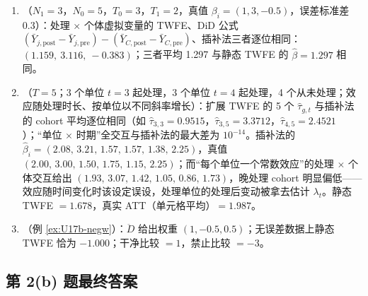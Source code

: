 \begin{exmp}[数值验证：$\hat\beta_i$ 的三种算法、扩展 TWFE = 插补、负权重]\label{ex:U17b-sim}
\begin{enumerate}
  \item {}（$N_1=3$，$N_0=5$，$T_0=3$，$T_1=2$，真值 $\beta_i=(1,3,-0.5)$，误差标准差 0.3）：处理 $\times$ 个体虚拟变量的 TWFE、DiD 公式 $(\bar Y_{j,\mathrm{post}}-\bar Y_{j,\mathrm{pre}})-(\bar Y_{C,\mathrm{post}}-\bar Y_{C,\mathrm{pre}})$、插补法三者逐位相同：$(1.159,\ 3.116,\ -0.383)$；三者平均 1.297 与静态 TWFE 的 $\hat\beta=1.297$ 相同。
  \item {}（$T=5$；3 个单位 $t=3$ 起处理，3 个单位 $t=4$ 起处理，4 个从未处理；效应随处理时长、按单位以不同斜率增长）：扩展 TWFE 的 5 个 $\hat\tau_{g,t}$ 与插补法的 cohort 平均逐位相同（如 $\hat\tau_{3,3}=0.9515$，$\hat\tau_{3,5}=3.3712$，$\hat\tau_{4,5}=2.4521$）；“单位 $\times$ 时期”全交互与插补法的最大差为 $10^{-14}$。插补法的 $\hat\beta_i=(2.08,\,3.21,\,1.57,\,1.57,\,1.38,\,2.25)$，真值 $(2.00,\,3.00,\,1.50,\,1.75,\,1.15,\,2.25)$；而“每个单位一个常数效应”的处理 $\times$ 个体交互给出 $(1.93,\,3.07,\,1.42,\,1.05,\,0.86,\,1.73)$，晚处理 cohort 明显偏低——效应随时间变化时该设定误设，处理单位的处理后变动被拿去估计 $\lambda_t$。静态 TWFE $=1.678$，真实 ATT（单元格平均）$=1.987$。
  \item {}（例 \ref{ex:U17b-negw}）：$\ddot D$ 给出权重 $(1,-0.5,0.5)$；无误差数据上静态 TWFE 恰为 $-1.000$；干净比较 $=1$，禁止比较 $=-3$。
\end{enumerate}
\end{exmp}

\subsection{第 2(b) 题最终答案}\label{sec:U17b-2b-ans}

